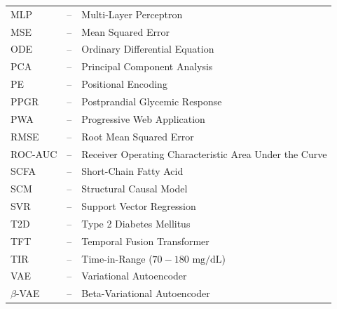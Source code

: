 \documentclass[a4paper, 12pt]{report}
\theoremstyle{definition}
\begin{document}
\begin{longtable}{lll}
    MLP &--& Multi-Layer Perceptron \\
    MSE &--& Mean Squared Error \\
    ODE &--& Ordinary Differential Equation \\
    PCA &--& Principal Component Analysis \\
    PE &--& Positional Encoding \\
    PPGR &--& Postprandial Glycemic Response \\
    PWA &--& Progressive Web Application \\
    RMSE &--& Root Mean Squared Error \\
    ROC-AUC &--& Receiver Operating Characteristic Area Under the Curve \\
    SCFA &--& Short-Chain Fatty Acid \\
    SCM &--& Structural Causal Model \\
    SVR &--& Support Vector Regression \\
    T2D &--& Type 2 Diabetes Mellitus \\
    TFT &--& Temporal Fusion Transformer \\
    TIR &--& Time-in-Range ($70 - 180\text{ mg/dL}$) \\
    VAE &--& Variational Autoencoder \\
    $\beta$-VAE &--& Beta-Variational Autoencoder \\
	\end{longtable}
	\newpage

\end{document}
